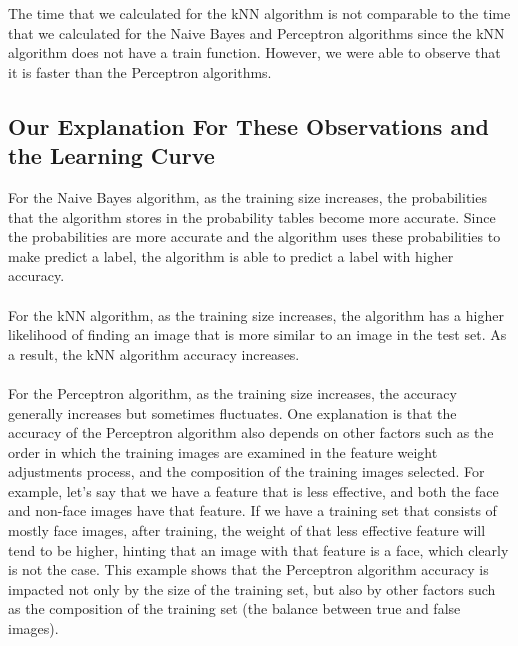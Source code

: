 \documentclass{article}
\begin{document}
The time that we calculated for the kNN algorithm is not comparable to the time that we calculated for the Naive Bayes and Perceptron algorithms since the kNN algorithm does not have a train function. However, we were able to observe that it is faster than the Perceptron algorithms.
\subsection{Our Explanation For These Observations and the Learning Curve}

For the Naive Bayes algorithm, as the training size increases, the probabilities that the algorithm stores in the probability tables become more accurate. Since the probabilities are more accurate and the algorithm uses these probabilities to make predict a label, the algorithm is able to predict a label with higher accuracy. \\\\
For the kNN algorithm, as the training size increases, the algorithm has a higher likelihood of finding an image that is more similar to an image in the test set. As a result, the kNN algorithm accuracy increases. \\\\

For the Perceptron algorithm, as the training size increases, the accuracy generally increases but sometimes fluctuates. One explanation is that the accuracy of the Perceptron algorithm also depends on other factors such as the order in which the training images are examined in the feature weight adjustments process, and the composition of the training images selected. For example, let’s say that we have a feature that is less effective, and both the face and non-face images have that feature. If we have a training set that consists of mostly face images, after training, the weight of that less effective feature will tend to be higher, hinting that an image with that feature is a face, which clearly is not the case. This example shows that the Perceptron algorithm accuracy is impacted not only by the size of the training set, but also by other factors such as the composition of the training set (the balance between true and false images).
\end{document}
